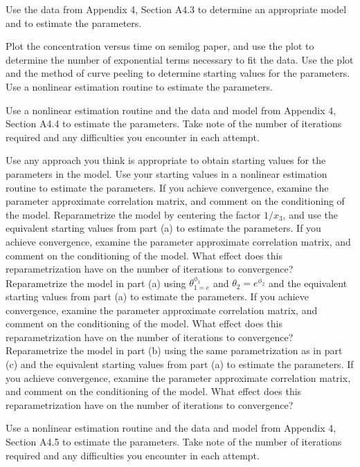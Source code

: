 \begin{problems}
\prob Use the data from Appendix 4, Section A4.3 to determine an
  appropriate model and to estimate the parameters.

  \subprob Plot the concentration versus time on semilog paper,
    and use the plot to determine the number of
    exponential terms necessary to fit the data.
  \subprob Use the plot and the method of curve peeling to
    determine starting values for the parameters.
  \subprob Use a nonlinear estimation routine to estimate the
    parameters.

\prob Use a nonlinear estimation routine and the data and model
  from Appendix 4, Section A4.4 to estimate the parameters.
  Take note of the number of iterations required and any
  difficulties you encounter in each attempt.

  \subprob Use any approach you think is appropriate to obtain
    starting values for the parameters in the model.
  \subprob Use your starting values in a nonlinear estimation
    routine to estimate the parameters.
    If you achieve convergence, examine the parameter
    approximate correlation matrix, and comment on the
    conditioning of the model.
  \subprob Reparametrize the model by centering the factor $1 /
    x_{3}$, and use the equivalent starting values from
    part (a) to estimate the parameters.
    If you achieve convergence, examine the parameter
    approximate correlation matrix, and comment on the
    conditioning of the model.
    What effect does this reparametrization have on the
    number of iterations to convergence?
  \subprob Reparametrize the model in part (a) using
    $\theta_{1=e}^{ \phi_1 }$ and $\theta_2=e^{\phi_2}$
    and the equivalent starting values from part (a)
    to estimate the parameters.
    If you achieve convergence, examine the parameter
    approximate correlation matrix, and comment on the
    conditioning of the model.
    What effect does this reparametrization have on the
    number of iterations to convergence?
  \subprob Reparametrize the model in part (b) using the same
    parametrization as in part (c) and the equivalent
    starting values from part (a) to estimate the
    parameters.
    If you achieve convergence, examine the parameter
    approximate correlation matrix, and comment on the
    conditioning of the model.
    What effect does this reparametrization have on the
    number of iterations to convergence?

\prob Use a nonlinear estimation routine and the data and
  model from Appendix 4, Section A4.5 to estimate the
  parameters.
  Take note of the number of iterations required and
  any difficulties you encounter in each attempt.


\end{problems}
